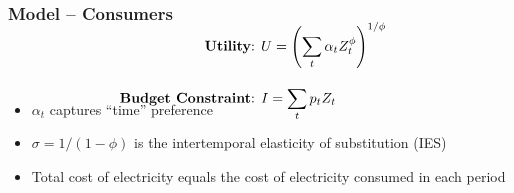 \documentclass[aspectratio=169]{beamer}
\begin{document}
	
	\begin{frame}
		\frametitle{Model -- Consumers}
		
		
		\vspace{1em}
		\begin{block}{}
			\small
			\begin{align*}
			\\[-3em] \text{\textbf{Utility}: } &U = \left( \sum_t \alpha_t Z_t^\phi  \right)^{1/\phi} \\[1em]
			\text{\textbf{Budget Constraint}: } &I = \sum_t p_t Z_t \\[-2.5em]
			\end{align*}
		\end{block}
		
		\begin{itemize}
			\setlength\itemsep{0.5em}
			\small
			\item $\alpha_t$ captures ``time'' preference 
			\item  $\sigma = 1/(1-\phi)$ is the intertemporal elasticity of substitution (IES) 
			\item Total cost of electricity equals the cost of electricity consumed in each period
		\end{itemize}
		
	\end{frame}
	
	
	
\end{document}
